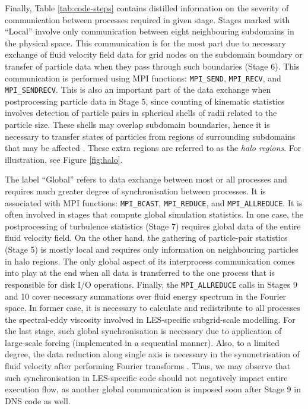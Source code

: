 \documentclass{pracamgren}
\begin{document}
Finally, Table \ref{tab:code-steps} contains distilled information on the severity of communication between processes required in given stage.
Stages marked with ``Local'' involve only communication between eight neighbouring subdomains in the physical space.
This communication is for the most part due to necessary exchange of fluid velocity field data for grid nodes on the subdomain boundary or transfer of particle data when they pass through such boundaries (Stage 6).
This communication is performed using MPI functions: \texttt{MPI\_SEND}, \texttt{MPI\_RECV}, and \texttt{MPI\_SENDRECV}.
This is also an important part of the data exchange when postprocessing particle data in Stage 5, since counting of kinematic statistics involves detection of particle pairs in spherical shells of radii related to the particle size.
These shells may overlap subdomain boundaries, hence it is necessary to transfer states of particles from regions of surrounding subdomains that may be affected \parencite{Ayala2014}.
These extra regions are referred to as the \emph{halo regions}.
For illustration, see Figure \ref{fig:halo}.

The label ``Global'' refers to data exchange between most or all processes and requires much greater degree of synchronisation between processes.
It is associated with MPI functions: \texttt{MPI\_BCAST}, \texttt{MPI\_REDUCE}, and \texttt{MPI\_ALLREDUCE}.
It is often involved in stages that compute global simulation statistics.
In one case, the postprocessing of turbulence statistics (Stage 7) requires global data of the entire fluid velocity field.
On the other hand, the gathering of particle-pair statistics (Stage 5) is mostly local and requires only information on neighbouring particles in halo regions.
The only global aspect of its interprocess communication comes into play at the end when all data is transferred to the one process that is responsible for disk I/O operations.
Finally, the \texttt{MPI\_ALLREDUCE} calls in Stages 9 and 10 cover necessary summations over fluid energy spectrum in the Fourier space.
In former case, it is necessary to calculate and redistribute to all processes the spectral-eddy viscosity involved in LES-specific subgrid-scale modelling.
For the last stage, such global synchronisation is necessary due to application of large-scale forcing (implemented in a sequential manner).
Also, to a limited degree, the data reduction along single axis is necessary in the symmetrisation of fluid velocity after performing Fourier transforms \parencite{Ayala2014}. 
Thus, we may observe that such synchronisation in LES-specific code should not negatively impact entire execution flow, as another global communication is imposed soon after Stage 9 in DNS code as well. 
\end{document}
